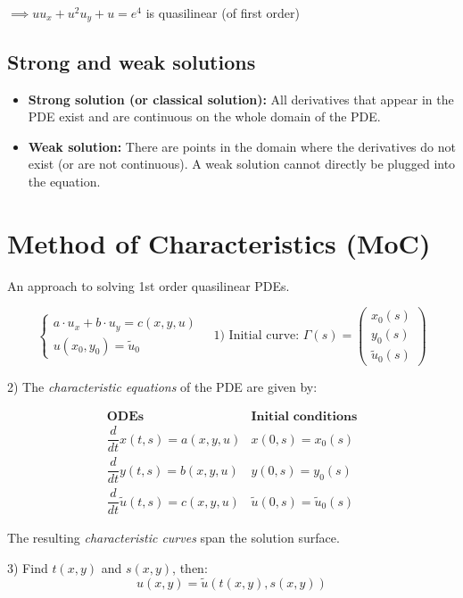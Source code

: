 $\implies uu_x + u^2u_y + u = e^4$ is quasilinear (of first order)

\subsection{Strong and weak solutions}
\begin{itemize}
    \item \textbf{Strong solution (or classical solution):} All derivatives that appear in the PDE exist and are continuous on the whole domain of the PDE.
    \item \textbf{Weak solution:} There are points in the domain where the derivatives do not exist (or are not continuous). A weak solution cannot directly be plugged into the equation.
\end{itemize}

\section{Method of Characteristics (MoC)}

An approach to solving 1st order quasilinear PDEs.

\[
\begin{cases}
a \cdot u_x + b \cdot u_y = c(x,y,u) \\
u(x_0,y_0) = \tilde{u}_0
\end{cases}
\quad
\text{1) Initial curve: } \Gamma(s) =
\begin{pmatrix}
x_0(s) \\
y_0(s) \\
\tilde{u}_0(s)
\end{pmatrix}
\]

2) The \textit{characteristic equations} of the PDE are given by:

\[
\begin{array}{c|c}
\textbf{ODEs} & \textbf{Initial conditions} \\ \hline
\dfrac{d}{dt} x(t,s) = a(x,y,u) & x(0,s) = x_0(s) \\[1em]
\dfrac{d}{dt} y(t,s) = b(x,y,u) & y(0,s) = y_0(s) \\[1em]
\dfrac{d}{dt} \tilde{u}(t,s) = c(x,y,u) & \tilde{u}(0,s) = \tilde{u}_0(s)
\end{array}
\]

The resulting \textit{characteristic curves} span the solution surface.

3) Find \(t(x,y)\) and \(s(x,y)\), then:  
\[
u(x,y) = \tilde{u}(t(x,y), s(x,y))
\]

